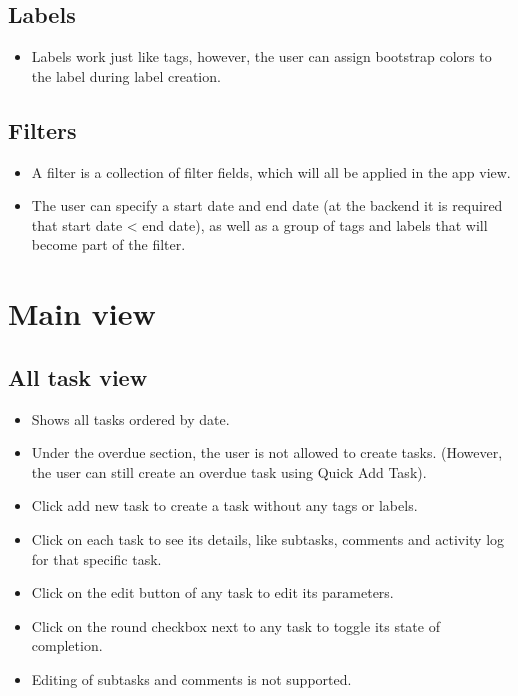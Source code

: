\documentclass{article}
\begin{document}
\subsection{Labels}
\begin{itemize}
  \item Labels work just like tags, however, the user can assign bootstrap colors to the label during label creation.
\end{itemize}

\subsection{Filters}
\begin{itemize}
  \item A filter is a collection of filter fields, which will all be applied in the app view.
  \item The user can specify a start date and end date (at the backend it is required that start date < end date), as well as a group of tags and labels that will become part of the filter.
  
\end{itemize}

\section{Main view}
\subsection{All task view}
\begin{itemize}
  \item Shows all tasks ordered by date.
  \item Under the overdue section, the user is not allowed to create tasks. (However, the user can still create an overdue task using Quick Add Task).
  \item Click add new task to create a task without any tags or labels.
  \item Click on each task to see its details, like subtasks, comments and activity log for that specific task.
  \item Click on the edit button of any task to edit its parameters.
  \item Click on the round checkbox next to any task to toggle its state of completion.
  \item Editing of subtasks and comments is not supported.
\end{itemize}
\end{document}
